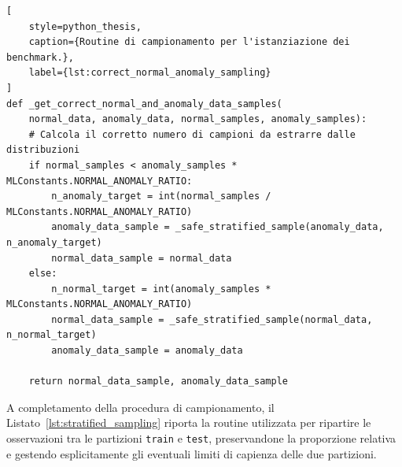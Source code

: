 \newpage

\begin{lstlisting}[
    style=python_thesis,
    caption={Routine di campionamento per l'istanziazione dei benchmark.},
    label={lst:correct_normal_anomaly_sampling}
]
def _get_correct_normal_and_anomaly_data_samples(
    normal_data, anomaly_data, normal_samples, anomaly_samples):
    # Calcola il corretto numero di campioni da estrarre dalle distribuzioni
    if normal_samples < anomaly_samples * MLConstants.NORMAL_ANOMALY_RATIO:
        n_anomaly_target = int(normal_samples / MLConstants.NORMAL_ANOMALY_RATIO)
        anomaly_data_sample = _safe_stratified_sample(anomaly_data, n_anomaly_target)
        normal_data_sample = normal_data
    else:
        n_normal_target = int(anomaly_samples * MLConstants.NORMAL_ANOMALY_RATIO)
        normal_data_sample = _safe_stratified_sample(normal_data, n_normal_target)
        anomaly_data_sample = anomaly_data

    return normal_data_sample, anomaly_data_sample
\end{lstlisting}

A completamento della procedura di campionamento, il Listato~\ref{lst:stratified_sampling} riporta la routine utilizzata per ripartire le osservazioni tra le partizioni \texttt{train} e \texttt{test}, preservandone la proporzione relativa e gestendo esplicitamente gli eventuali limiti di capienza delle due partizioni.

